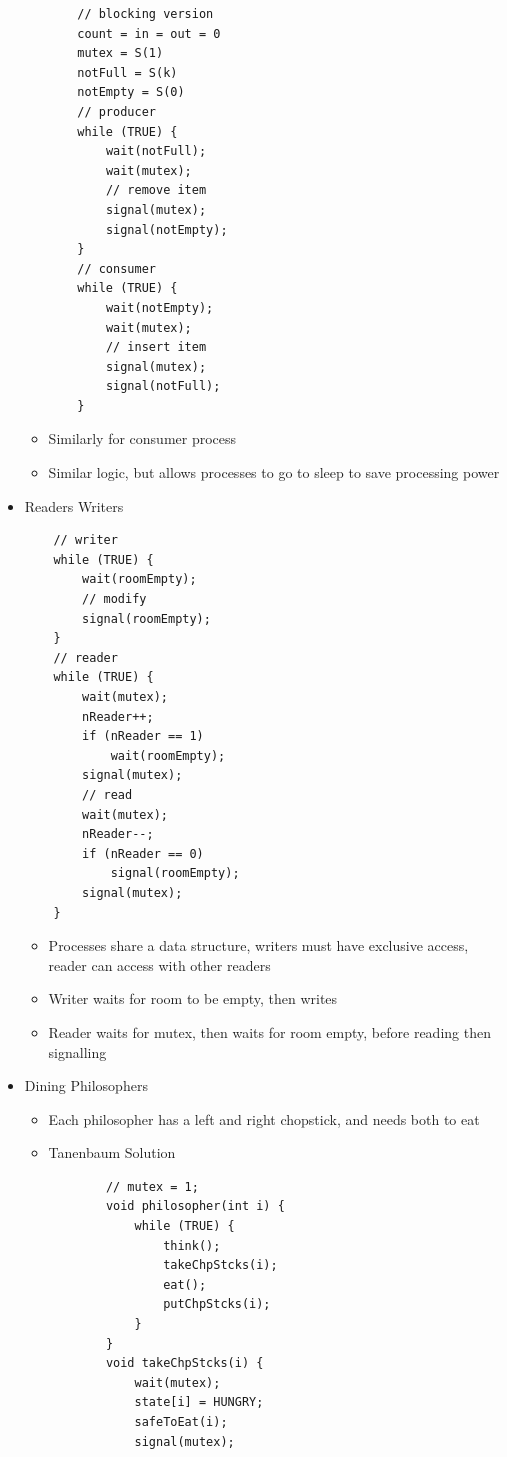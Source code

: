\documentclass[10pt, landscape]{article}
\begin{document}
\begin{multicols*}{3}
\begin{itemize}
\begin{itemize}
\begin{verbatim}
    // blocking version
    count = in = out = 0
    mutex = S(1)
    notFull = S(k)
    notEmpty = S(0)
    // producer
    while (TRUE) {
        wait(notFull);
        wait(mutex);
        // remove item
        signal(mutex);
        signal(notEmpty);
    }
    // consumer
    while (TRUE) {
        wait(notEmpty);
        wait(mutex);
        // insert item
        signal(mutex);
        signal(notFull);
    }
        \end{verbatim}
        \item Similarly for consumer process
        \item Similar logic, but allows processes to go to sleep to save processing power
    \end{itemize}
    \item Readers Writers
    \begin{verbatim}
    // writer
    while (TRUE) {
        wait(roomEmpty);
        // modify
        signal(roomEmpty);
    }
    // reader
    while (TRUE) {
        wait(mutex);
        nReader++;
        if (nReader == 1)
            wait(roomEmpty);
        signal(mutex);
        // read
        wait(mutex);
        nReader--;
        if (nReader == 0)
            signal(roomEmpty);
        signal(mutex);
    }
    \end{verbatim}
    \begin{itemize}
        \item Processes share a data structure, writers must have exclusive access, reader can access with other readers
        \item Writer waits for room to be empty, then writes
        \item Reader waits for mutex, then waits for room empty, before reading then signalling
    \end{itemize}
    \item Dining Philosophers
    \begin{itemize}
        \item Each philosopher has a left and right chopstick, and needs both to eat
        \item Tanenbaum Solution
        \begin{verbatim}
        // mutex = 1;
        void philosopher(int i) {
            while (TRUE) {
                think();
                takeChpStcks(i);
                eat();
                putChpStcks(i);
            }
        }
        void takeChpStcks(i) {
            wait(mutex);
            state[i] = HUNGRY;
            safeToEat(i);
            signal(mutex);

\end{verbatim}
\end{itemize}
\end{itemize}
\end{multicols*}
\end{document}
